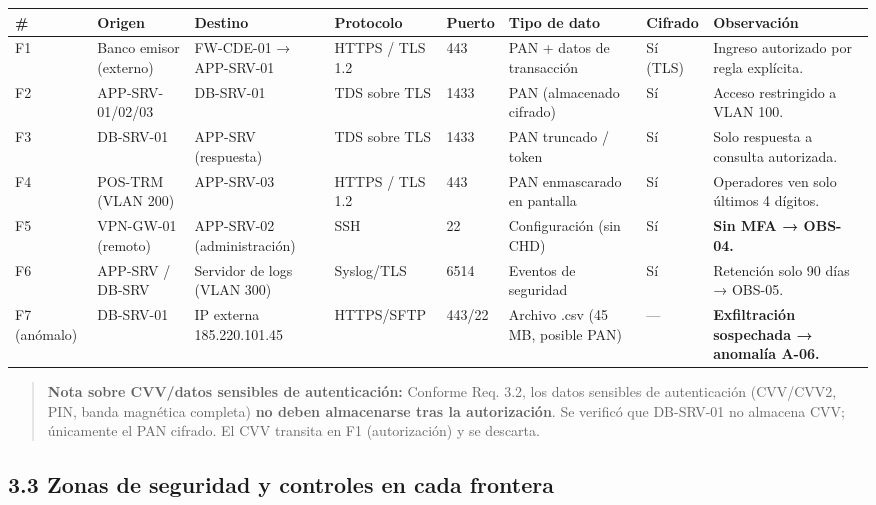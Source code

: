 \documentclass[11pt,a4paper]{article}
\begin{document}
\begin{tabularx}{\textwidth}{P{1.2cm}P{1.5cm}P{1.5cm}P{2cm}P{1.5cm}P{1.2cm}P{1cm}L}
\toprule
\textbf{#} & \textbf{Origen} & \textbf{Destino} & \textbf{Protocolo} & \textbf{Puerto} & \textbf{Tipo de dato} & \textbf{Cifrado} & \textbf{Observación} \\
\midrule
F1 & Banco emisor (externo) & FW-CDE-01 → APP-SRV-01 & HTTPS / TLS 1.2 & 443 & PAN + datos de transacción & Sí (TLS) & Ingreso autorizado por regla explícita. \\
F2 & APP-SRV-01/02/03 & DB-SRV-01 & TDS sobre TLS & 1433 & PAN (almacenado cifrado) & Sí & Acceso restringido a VLAN 100. \\
F3 & DB-SRV-01 & APP-SRV (respuesta) & TDS sobre TLS & 1433 & PAN truncado / token & Sí & Solo respuesta a consulta autorizada. \\
F4 & POS-TRM (VLAN 200) & APP-SRV-03 & HTTPS / TLS 1.2 & 443 & PAN enmascarado en pantalla & Sí & Operadores ven solo últimos 4 dígitos. \\
F5 & VPN-GW-01 (remoto) & APP-SRV-02 (administración) & SSH & 22 & Configuración (sin CHD) & Sí & \textbf{Sin MFA → OBS-04.} \\
F6 & APP-SRV / DB-SRV & Servidor de logs (VLAN 300) & Syslog/TLS & 6514 & Eventos de seguridad & Sí & Retención solo 90 días → OBS-05. \\
F7 (anómalo) & DB-SRV-01 & IP externa 185.220.101.45 & HTTPS/SFTP & 443/22 & Archivo .csv (45 MB, posible PAN) & — & \textbf{Exfiltración sospechada → anomalía A-06.} \\
\bottomrule
\end{tabularx}

\begin{quote}
\textbf{Nota sobre CVV/datos sensibles de autenticación:} Conforme Req. 3.2, los datos sensibles de autenticación (CVV/CVV2, PIN, banda magnética completa) \textbf{no deben almacenarse tras la autorización}. Se verificó que DB-SRV-01 no almacena CVV; únicamente el PAN cifrado. El CVV transita en F1 (autorización) y se descarta.
\end{quote}

\subsection{3.3 Zonas de seguridad y controles en cada frontera}
\end{document}
